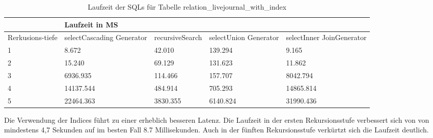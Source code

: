 \begin{table}[H]
	\centering
	\begin{tabular}{l|l|l|l|l|l|}
		\cline{2-6}
		& \multicolumn{5}{|l|}{Laufzeit in MS}                                                                                                                                                  \\ \hline
		\multicolumn{1}{|l|}{\multirow{2}{2cm}{Rerkusions-tiefe}} & \multicolumn{2}{|l|}{\multirow{2}{3cm}{selectCascading Generator}} & \multirow{2}{2.8cm}{recursiveSearch} & \multirow{2}{2.5cm}{selectUnion Generator} & \multirow{2}{2.5cm}{selectInner JoinGenerator} \\
		\multicolumn{1}{|l|}{}
		& \multicolumn{2}{|l|}{}                                           &                                  &                                     &                                           \\ \hline
		
		
		\multicolumn{1}{|l|}{1}                                 & \multicolumn{2}{l|}{8.672}                                       & 42.010                                                & 139.294                                                   & 9.165                                                           \\ \hline
		\multicolumn{1}{|l|}{2}                                 & \multicolumn{2}{l|}{15.240}                                      & 69.129                                                & 131.623                                                   & 11.862                                                          \\ \hline
		\multicolumn{1}{|l|}{3}                                 & \multicolumn{2}{l|}{6936.935}                                    & 114.466                                               & 157.707                                                   & 8042.794                                                        \\ \hline
		\multicolumn{1}{|l|}{4}                                 & \multicolumn{2}{l|}{14137.544}                                   & 484.914                                               & 705.293                                                   & 14865.814                                                       \\ \hline
		\multicolumn{1}{|l|}{5}                                 & \multicolumn{2}{l|}{22464.363}                                   & 3830.355                                              & 6140.824                                                  & 31990.436                                                       \\ \hline
	\end{tabular}
	\caption{Laufzeit der SQLs für Tabelle relation\_livejournal\_with\_index}
	\label{2.relationlivejournalindex.table}
\end{table}
Die Verwendung der Indices führt zu einer erheblich besseren Latenz. Die Laufzeit in der ersten Rekursionsstufe verbessert sich von von mindestens 4,7 Sekunden auf im besten Fall 8.7 Millisekunden. Auch in der fünften Rekursionsstufe verkürtzt sich die Laufzeit deutlich.


